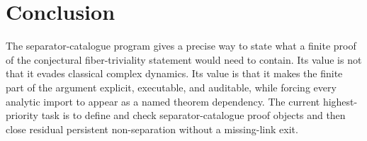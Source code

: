 \documentclass[11pt]{amsart}
\begin{document}
\section{Conclusion}

The separator-catalogue program gives a precise way to state what a finite proof of the conjectural fiber-triviality statement would need to contain.  Its value is not that it evades classical complex dynamics.  Its value is that it makes the finite part of the argument explicit, executable, and auditable, while forcing every analytic import to appear as a named theorem dependency.  The current highest-priority task is to define and check separator-catalogue proof objects and then close residual persistent non-separation without a missing-link exit.



\end{document}
